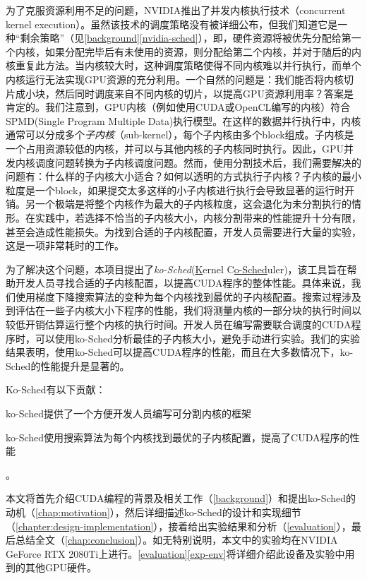 为了克服资源利用不足的问题，NVIDIA推出了并发内核执行技术（concurrent kernel execution）\cite{concurrent-kernel-execution}。虽然该技术的调度策略没有被详细公布，但我们知道它是一种“剩余策略”（见\autoref{background}\autoref{nvidia-sched}），即，硬件资源将被优先分配给第一个内核，如果分配完毕后有未使用的资源，则分配给第二个内核，并对于随后的内核重复此方法。当内核较大时，这种调度策略使得不同内核难以并行执行，而单个内核运行无法实现GPU资源的充分利用。一个自然的问题是：我们能否将内核切片成小块，然后同时调度来自不同内核的切片，以提高GPU资源利用率？答案是肯定的。我们注意到，GPU内核（例如使用CUDA或OpenCL编写的内核）符合SPMD(Single Program Multiple Data)执行模型。在这样的数据并行执行中，内核通常可以分成多个\emph{子内核}（sub-kernel），每个子内核由多个block组成。子内核是一个占用资源较低的内核，并可以与其他内核的子内核同时执行。因此，GPU并发内核调度问题转换为子内核调度问题。然而，使用分割技术后，我们需要解决的问题有：什么样的子内核大小适合？如何以透明的方式执行子内核？子内核的最小粒度是一个block，如果提交太多这样的小子内核进行执行会导致显著的运行时开销。另一个极端是将整个内核作为最大的子内核粒度，这会退化为未分割执行的情形。在实践中，若选择不恰当的子内核大小，内核分割带来的性能提升十分有限，甚至会造成性能损失。为找到合适的子内核配置，开发人员需要进行大量的实验，这是一项非常耗时的工作。

为了解决这个问题，本项目提出了\emph{ko-Sched}(\underline{K}ernel C\underline{o-Sched}uler)，该工具旨在帮助开发人员寻找合适的子内核配置，以提高CUDA程序的整体性能。具体来说，我们使用梯度下降搜索算法的变种为每个内核找到最优的子内核配置。搜索过程涉及到评估在一些子内核大小下程序的性能，我们将测量内核的一部分块的执行时间以较低开销估算运行整个内核的执行时间。开发人员在编写需要联合调度的CUDA程序时，可以使用ko-Sched分析最佳的子内核大小，避免手动进行实验。我们的实验结果表明，使用ko-Sched可以提高CUDA程序的性能，而且在大多数情况下，ko-Sched的性能提升是显著的。


Ko-Sched有以下贡献：
\begin{enumerate*}[label=\roman*),itemjoin={\quad}]
    \item ko-Sched提供了一个方便开发人员编写可分割内核的框架
    \item ko-Sched使用搜索算法为每个内核找到最优的子内核配置，提高了CUDA程序的性能
\end{enumerate*}
。

本文将首先介绍CUDA编程的背景及相关工作（\autoref{background}）和提出ko-Sched的动机（\autoref{chap:motivation}），然后详细描述ko-Sched的设计和实现细节（\autoref{chapter:design-implementation}），接着给出实验结果和分析（\autoref{evaluation}），最后总结全文（\autoref{chap:conclusion}）。如无特别说明，本文中的实验均在NVIDIA GeForce RTX 2080Ti上进行。\autoref{evaluation}\autoref{exp-env}将详细介绍此设备及实验中用到的其他GPU硬件。
